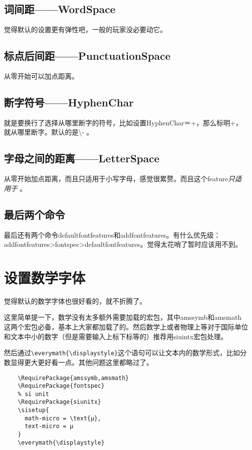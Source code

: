 \documentclass[11pt,oneside]{book}
\begin{document}
  \subsection{词间距——WordSpace}
  觉得默认的设置更有弹性吧，一般的玩家没必要动它。

  \subsection{标点后间距——PunctuationSpace}
  从零开始可以加点距离。

  \subsection{断字符号——HyphenChar}
  就是要换行了选择从哪里断字的符号，比如设置HyphenChar＝{+}，那么标明+，就从哪里断字。默认的是\textbackslash{}- 。

  \subsection{字母之间的距离——LetterSpace}
  从零开始加点距离，而且只适用于小写字母，感觉很累赘。而且这个feature\emph{只适用于\XeTeX} 。


  \subsection{最后两个命令}
  最后还有两个命令defaultfontfeatures和addfontfeatures。有什么优先级：\\ addfontfeatures>fontspec>defaultfontfeatures。觉得太花哨了暂时应该用不到。




  \section{设置数学字体}
  觉得默认的数学字体也很好看的，就不折腾了。

  这里简单提一下，数学没有太多额外需要加载的宏包，其中amssymb和amsmath这两个宏包必备，基本上大家都加载了的。然后数学上或者物理上等对于国际单位和文本中小的数字（但是需要输入上标下标等的）推荐用siuintx宏包处理。

  然后通过\verb+\everymath{\displaystyle}+这个语句可以让文本内的数学形式，比如分数显得更大更好看一点。其他问题这里都略过了。

  \begin{Verbatim}
    \RequirePackage{amssymb,amsmath}
    \RequirePackage{fontspec}
    % si unit
    \RequirePackage{siunitx}
    \sisetup{
      math-micro = \text{μ},
      text-micro = μ
    }
    \everymath{\displaystyle}
  \end{Verbatim}
\end{document}
